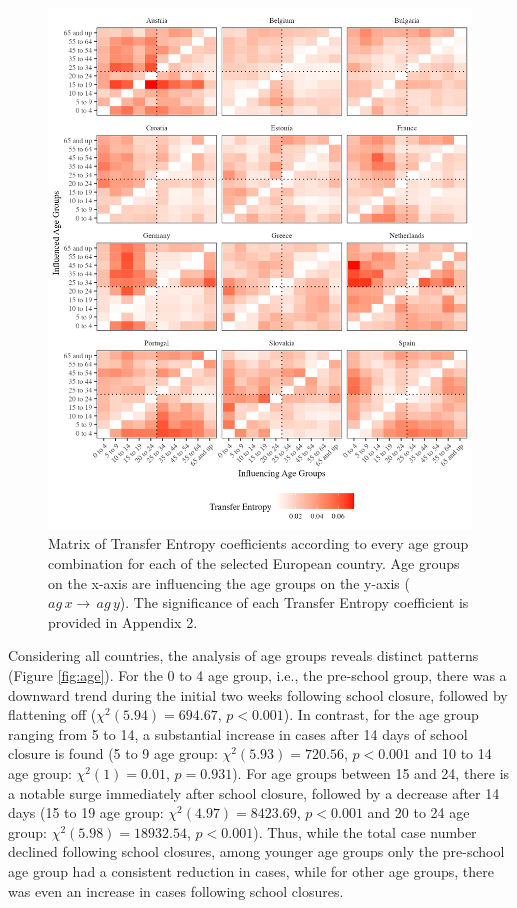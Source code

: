 \documentclass[unnumsec,webpdf,contemporary,large]{oup-authoring-template}%
\theoremstyle{thmstyleone}%
\theoremstyle{thmstyletwo}%
\theoremstyle{thmstylethree}%
\begin{document}
\begin{figure}[H]
\includegraphics[width=\textwidth]{manuscript_files/figure-latex/te-1} \caption{Matrix of Transfer Entropy coefficients according to every age group combination for each of the selected European country. Age groups on the x-axis are influencing the age groups on the y-axis (\(ag\,x \rightarrow\,ag\,y\)). The significance of each Transfer Entropy coefficient is provided in Appendix 2.}\label{fig:te}
\end{figure}

Considering all countries, the analysis of age groups reveals distinct patterns (Figure \ref{fig:age}). For the 0 to 4 age group, i.e., the pre-school group, there was a downward trend during the initial two weeks following school closure, followed by flattening off (\(\chi^2(5.94) = 694.67\), \(p < 0.001\)). In contrast, for the age group ranging from 5 to 14, a substantial increase in cases after 14 days of school closure is found (5 to 9 age group: \(\chi^2(5.93) = 720.56\), \(p < 0.001\) and 10 to 14 age group: \(\chi^2(1) = 0.01\), \(p = 0.931\)). For age groups between 15 and 24, there is a notable surge immediately after school closure, followed by a decrease after 14 days (15 to 19 age group: \(\chi^2(4.97) = 8423.69\), \(p < 0.001\) and 20 to 24 age group: \(\chi^2(5.98) = 18932.54\), \(p < 0.001\)). Thus, while the total case number declined following school closures, among younger age groups only the pre-school age group had a consistent reduction in cases, while for other age groups, there was even an increase in cases following school closures.
\end{document}
